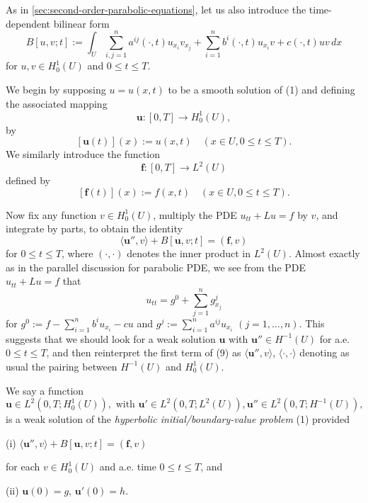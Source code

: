 As in \cref{sec:second-order-parabolic-equations}, let us also introduce the time-dependent bilinear form
\[
B[u,v;t] := \int_U \sum_{i,j=1}^{n} a^{ij}(\cdot,t)u_{x_i}v_{x_j} + \sum_{i=1}^{n} b^i(\cdot,t)u_{x_i}v + c(\cdot,t)uv \, dx
\tag{8}
\]
for $u, v \in H_0^1(U)$ and $0 \leq t \leq T$.

\begin{remark}
\label{rem:motivation-weak-solution-hyperbolic}
We begin by supposing $u = u(x,t)$ to be a smooth solution of (1) and defining the associated mapping
\[
\mathbf{u} : [0,T] \to H^1_0(U),
\]
by
\[
[\mathbf{u}(t)](x) := u(x,t) \quad (x \in U, 0 \le t \le T).
\]
We similarly introduce the function
\[
\mathbf{f} : [0,T] \to L^2(U)
\]
defined by
\[
[\mathbf{f}(t)](x) := f(x,t) \quad (x \in U, 0 \le t \le T).
\]

Now fix any function $v \in H^1_0(U)$, multiply the PDE $u_{tt} + Lu = f$ by $v$, and integrate by parts, to obtain the identity
\[
\langle \mathbf{u}'', v \rangle + B[\mathbf{u}, v; t] = (\mathbf{f}, v)
\tag{9}
\]
for $0 \le t \le T$, where $(\cdot, \cdot)$ denotes the inner product in $L^2(U)$. Almost exactly as in the parallel discussion for parabolic PDE, we see from the PDE $u_{tt} + Lu = f$ that
\[
u_{tt} = g^0 + \sum_{j=1}^{n} g^j_{x_j}
\]
for $g^0 := f - \sum_{i=1}^{n} b^i u_{x_i} - cu$ and $g^j := \sum_{i=1}^{n} a^{ij} u_{x_i}$ $(j = 1, \ldots, n)$. This suggests that we should look for a weak solution $\mathbf{u}$ with $\mathbf{u}'' \in H^{-1}(U)$ for a.e. $0 \le t \le T$, and then reinterpret the first term of (9) as $\langle \mathbf{u}'', v \rangle$, $\langle \cdot, \cdot \rangle$ denoting as usual the pairing between $H^{-1}(U)$ and $H^1_0(U)$.
\end{remark}

\begin{definition}
\label{def:weak-solution-hyperbolic-bvp}
We say a function
\[
\mathbf{u} \in L^2(0, T; H^1_0(U)), \text{ with } \mathbf{u}' \in L^2(0, T; L^2(U)), \mathbf{u}'' \in L^2(0, T; H^{-1}(U)),
\]
is a weak solution of the \textit{hyperbolic initial/boundary-value problem} (1) provided

(i) $\langle \mathbf{u}'', v \rangle + B[\mathbf{u}, v; t] = (\mathbf{f}, v)$

for each $v \in H^1_0(U)$ and a.e. time $0 \le t \le T$, and

(ii) $\mathbf{u}(0) = g$, $\mathbf{u}'(0) = h$.
\end{definition}

